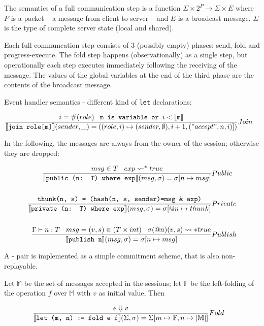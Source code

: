 \documentclass[acmsmall,review,anonymous]{acmart}\settopmatter{printfolios=true}
\begin{document}
The semantics of a full communication step is a function $\Sigma \times 2^{P} \rightarrow \Sigma \times E $ where $P$ is a packet -- a message from 
client to server -- and $E$ is a broadcast message. $\Sigma$ is the type of complete server state (local and shared).

Each full communcation step consists of 3 (possibly empty) phases: send, fold and progress-execute.
The fold step happens (observationally) as a single step, but operationally each step executes immediately following the receiving of the message.
The values of the global variables at the end of the third phase are the contents of the broadcast message.

Event handler semantics - different kind of \texttt{let} declarations:

\newcommand{\owner}{\mathbb{R}}
\begin{align*}
	\judge{&Join}{
		i = \#(role) \;\;\; \texttt{m is variable or } i < \semfunc[m]
	}{
		\semfunc[{join role[m]}](sender, \_) = ((role, i) \mapsto (sender, \emptyset), i+1, ("accept", n, i)])
	}
\end{align*}

In the following, the messages are always from the owner of the session; otherwise they are dropped:

\begin{align*}
	\judge{&Public}{
		msg \in T \; \; \; exp \leadsto^* true
	}{
		\semfunc[public (n: T) where exp](msg, \sigma) = \sigma [n \mapsto msg]
	}\\	\\
	\judge{&Private}{
		\texttt{thunk(n, s) = (hash(n, s, sender)=msg \& exp)}
	}{
		\semfunc[private (n: T) where exp](msg, \sigma) = \sigma [@n \mapsto thunk]
	}\\	\\
	\judge{&Publish}{
		\Gamma \vdash n : T \;\;\; msg = (v, s) \in (T \times int) \;\;\; \sigma(@n)(v, s) \leadsto* true
	}{
		\semfunc[publish n](msg, \sigma) = \sigma [n \mapsto msg]
	}
\end{align*}

A - pair is implemented as a simple commitment scheme, that is also non-replayable.

Let $\mathbb{M}$ be the set of messages accepted in the sessions;
let $\mathbb{F}$ be the left-folding of the operation $f$ over $\mathbb{M}$ with $v$ as initial value,
Then

\begin{align*}
	\judge{&Fold}{
		e \Downarrow v
	}{
		\semfunc[let (m, n) := fold e f](\Sigma, \sigma) = \Sigma [m \mapsto \mathbb{F}, n \mapsto |\mathbb{M}| ]
	}
\end{align*}
\end{document}
